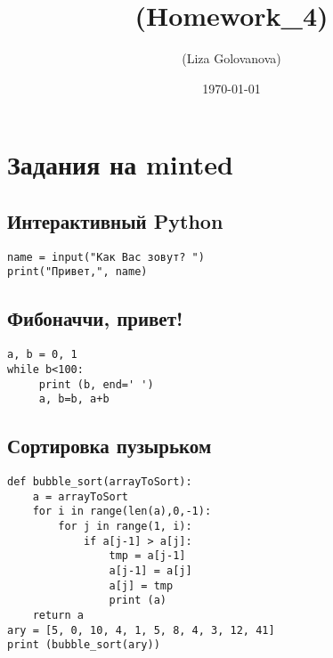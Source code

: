 \documentclass[10pt, a4paper]{article}
\begin{document}
\title{(Homework_4)}
\date{\today}
\author{(Liza Golovanova)}
\section{Задания на minted}
\subsection{Интерактивный Python}
\begin{verbatim}
name = input("Как Вас зовут? ")
print("Привет,", name)
\end{verbatim}

\subsection{Фибоначчи, привет!}
\begin{verbatim}
a, b = 0, 1
while b<100:
     print (b, end=' ')
     a, b=b, a+b
\end{verbatim}

\subsection{Сортировка пузырьком}
\begin{verbatim}
def bubble_sort(arrayToSort):
    a = arrayToSort
    for i in range(len(a),0,-1):
        for j in range(1, i):
            if a[j-1] > a[j]:
                tmp = a[j-1]
                a[j-1] = a[j]
                a[j] = tmp
                print (a)
    return a
ary = [5, 0, 10, 4, 1, 5, 8, 4, 3, 12, 41]
print (bubble_sort(ary))
\end{verbatim}
\end{document}
